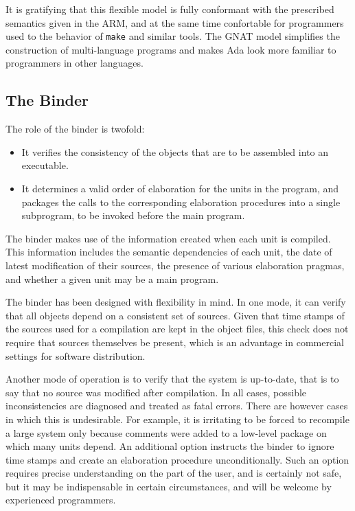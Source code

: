 It is gratifying that this flexible model is fully conformant with
the prescribed semantics given in the ARM,  and at the same
time confortable for 
programmers used to the behavior of {\tt make} and similar tools. The
GNAT model simplifies the construction of multi-language programs and
makes Ada look more familiar to programmers in other languages. 

\subsection{The Binder }
The role of the binder is twofold:

\begin{itemize}

\item It verifies the consistency of the objects that are to be assembled
into an executable. 

\item It determines a valid order of elaboration for the units in the
program, and packages the calls to the corresponding elaboration procedures
into a single subprogram, to be invoked before the main program.
 
\end{itemize}

The binder makes use of the information created when each unit is
compiled. This information includes the semantic dependencies of each unit,
the date of latest modification of their sources, the presence of various
elaboration pragmas, and whether a given unit may be a main program. 

The binder has been designed with flexibility in mind. In  one mode, it
can verify that all objects depend on a consistent set of sources. 
Given that time stamps of the sources used for a compilation
are kept in the object files, this check does not require that
sources themselves be present, which is an  advantage in 
commercial settings for software distribution.
 
Another mode of operation is to verify that the system is up-to-date, that
is to say that no source was modified after compilation. In  all cases,
possible inconsistencies are diagnosed and treated as fatal errors. There
are however cases in which this is undesirable. For example,  it is
irritating to be forced to recompile a large system only because comments
were added to a low-level package on  which many units depend.
An additional option instructs the binder to ignore time stamps and create
an elaboration procedure unconditionally. Such an option requires precise
understanding on the part of the user,  and is certainly not safe,  but it
may be indispensable in certain circumstances, and will be welcome by
experienced programmers.

